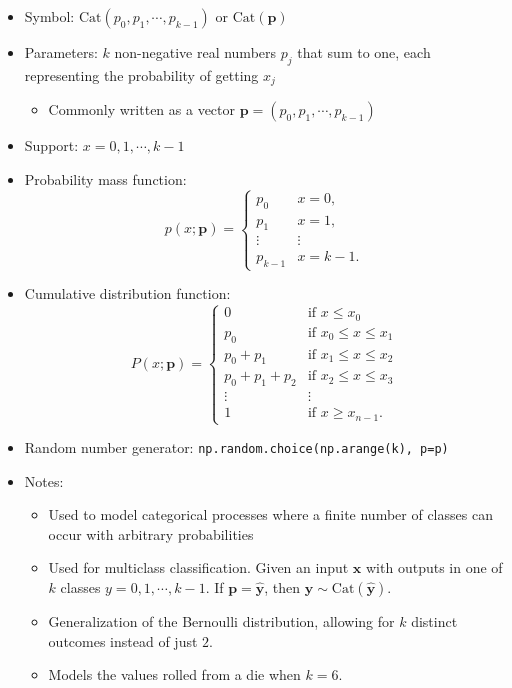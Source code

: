 \documentclass[
  letterpaper,
  DIV=11,
  numbers=noendperiod]{scrreprt}
\providecommand{\tightlist}{%
  \setlength{\itemsep}{0pt}\setlength{\parskip}{0pt}}\usepackage{longtable,booktabs,array}
\begin{document}
\begin{itemize}
\item
  Symbol: \(\text{Cat}(p_0,p_1,\cdots,p_{k-1})\) or
  \(\text{Cat}(\mathbf{p})\)
\item
  Parameters: \(k\) non-negative real numbers \(p_j\) that sum to one,
  each representing the probability of getting \(x_j\)

  \begin{itemize}
  \tightlist
  \item
    Commonly written as a vector
    \(\mathbf{p} = (p_0,p_1,\cdots,p_{k-1})\)
  \end{itemize}
\item
  Support: \(x = 0, 1, \cdots, k-1\)
\item
  Probability mass function: \[
  p(x; \mathbf{p}) = \begin{cases}
  p_0 & x = 0, \\
  p_1 & x = 1, \\
  \vdots & \vdots \\
  p_{k-1} & x = k-1.
  \end{cases}
  \]
\item
  Cumulative distribution function: \[
  P(x; \mathbf{p}) = 
  \begin{cases}
  0 & \text{if } x \leq x_0 \\
  p_0 & \text{if } x_0 \leq x \leq x_1 \\
  p_0 + p_1 & \text{if } x_1 \leq x \leq x_2 \\
  p_0 + p_1 + p_2 & \text{if } x_2 \leq x \leq x_3 \\
  \vdots & \vdots \\
  1 & \text{if } x \geq x_{n-1}.
  \end{cases}
  \]
\item
  Random number generator: \texttt{np.random.choice(np.arange(k),\ p=p)}
\item
  Notes:

  \begin{itemize}
  \tightlist
  \item
    Used to model categorical processes where a finite number of classes
    can occur with arbitrary probabilities
  \item
    Used for multiclass classification. Given an input \(\mathbf{x}\)
    with outputs in one of \(k\) classes \(y=0,1,\cdots,k-1\). If
    \(\mathbf{p}=\mathbf{\hat y}\), then
    \(\mathbf{y} \sim \text{Cat}(\mathbf{\hat y})\).
  \item
    Generalization of the Bernoulli distribution, allowing for \(k\)
    distinct outcomes instead of just \(2\).
  \item
    Models the values rolled from a die when \(k=6\).
  \end{itemize}
\end{itemize}
\end{document}
